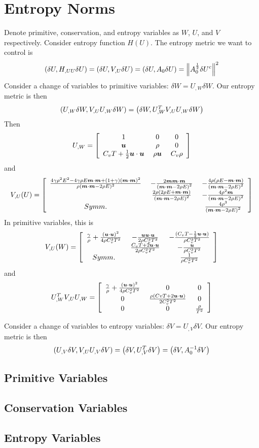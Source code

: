 \documentclass{article}
\begin{document}
\section*{Entropy Norms}
Denote primitive, conservation, and entropy variables as $W$, $U$, and $V$ respectively.
Consider entropy function $H(U)$.
The entropy metric we want to control is 
\[
\left( \delta U,H_{,UU}\delta U \right)=\left( \delta U,V_{,U}\delta U \right)=\left( \delta U,A_0\delta U \right)=\left\| A_0^{\frac{1}{2}}\delta U^c \right\|^2
\]
Consider a change of variables to primitive variables: $\delta W=U_{,W}\delta W$.
Our entropy metric is then
\[
\left( U_{,W}\delta W,V_{,U}U_{,W}\delta W \right)=\left( \delta W,U_{,W}^TV_{,U}U_{,W}\delta W \right)
\]
Then
\[
U_{,W}=\left[ \begin{array}{ccc} 1\; & 0\; & 0\\ \boldsymbol u\; & \rho\; & 0\\ C_vT+\frac{1}{2}\boldsymbol u\cdot\boldsymbol u\; & \rho\boldsymbol u\; & C_v\rho\\ \end{array} \right]
\]
and
\[
V_{,U}(U)=\left[ \begin{array}{ccc} \frac{4\gamma\rho^2E^2-4\gamma\rho E\boldsymbol m\cdot\boldsymbol m+(1+\gamma)(\boldsymbol m\cdot\boldsymbol m)^2}{\rho(\boldsymbol m\cdot\boldsymbol m-2\rho E)^2}\; & -\frac{2\boldsymbol m\boldsymbol m\cdot\boldsymbol m}{\left( \boldsymbol m\cdot\boldsymbol m-2\rho E \right)^2}\; & -\frac{4\rho(\rho E-\boldsymbol m\cdot\boldsymbol m)}{\left( \boldsymbol m\cdot\boldsymbol m-2\rho E \right)^2}\\ \; & \frac{2\rho(2\rho E+\boldsymbol m\cdot\boldsymbol m)}{\left( \boldsymbol m\cdot\boldsymbol m-2\rho E \right)^2}\; & -\frac{4\rho^2\boldsymbol m}{\left( \boldsymbol m\cdot\boldsymbol m-2\rho E \right)^2}\\ Symm.\; & \; & \frac{4\rho^3}{\left( \boldsymbol m\cdot\boldsymbol m-2\rho E \right)^2}\\ \end{array} \right]
\]
In primitive variables, this is
\[
V_{,U}(W)=\left[ \begin{array}{ccc} \frac{\gamma}{\rho}+\frac{(\boldsymbol u\cdot\boldsymbol u)^2}{4\rho C_v^2 T^2}\; & -\frac{\boldsymbol u\boldsymbol u\cdot\boldsymbol u}{2\rho C_v^2 T^2}\; & -\frac{(C_v T-\frac{1}{2}\boldsymbol u\cdot\boldsymbol u)}{\rho C_v^2 T^2}\\ \; & \frac{C_v T+2\boldsymbol u\cdot\boldsymbol u}{2\rho C_v^2 T^2}\; & -\frac{\boldsymbol u}{\rho C_v^2 T^2}\\ Symm.\; & \; & \frac{1}{\rho C_v^2 T^2}\\ \end{array} \right]
\]
and
\[
U_{,W}^TV_{,U}U_{,W}=\left[ \begin{array}{ccc} \frac{\gamma}{\rho}+\frac{\left( \boldsymbol u\cdot\boldsymbol u \right)^2}{4\rho C_v^2 T^2}\; & 0\; & 0\\ 0\; & \frac{\rho(Cv T+2\boldsymbol u\cdot\boldsymbol u)}{2C_v^2 T^2}\; & 0\\ 0\; & 0\; & \frac{\rho}{T^2}\\ \end{array} \right]
\]

Consider a change of variables to entropy variables: $\delta V=U_{,V}\delta V$.
Our entropy metric is then
\[
\left( U_{,V}\delta V,V_{,U}U_{,V}\delta V \right)=\left( \delta V,U_{,V}^T\delta V \right)=\left( \delta V, A_0^{-1}\delta V \right)
\]

\subsection*{Primitive Variables}

\subsection*{Conservation Variables}

\subsection*{Entropy Variables}
\end{document}
